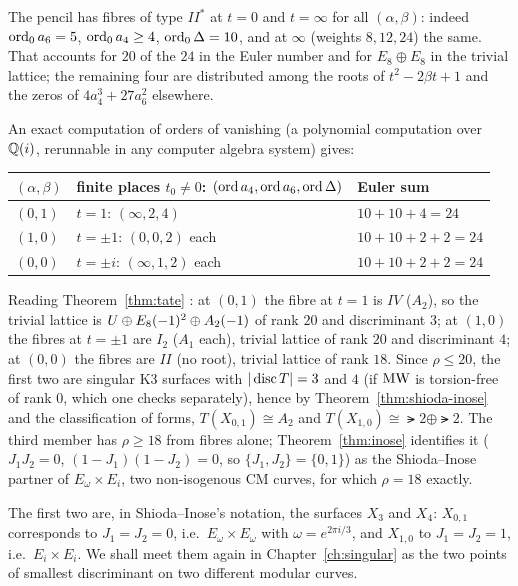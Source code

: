 The pencil has fibres of type $II^*$ at $t=0$ and $t=\infty$ for all
$(\alpha,\beta)$: indeed $\operatorname{ord}_0 a_6=5$, $\operatorname{ord}_0 a_4\ge4$, $\operatorname{ord}_0\Delta=10$,
and at $\infty$ (weights $8,12,24$) the same. That accounts for $20$ of the
$24$ in the Euler number and for $E_8\oplus E_8$ in the trivial lattice; the
remaining four are distributed among the roots of $t^2-2\beta t+1$ and the
zeros of $4a_4^3+27a_6^2$ elsewhere.

\begin{example}\label{ex:inose-points}
An exact computation of orders of vanishing (a polynomial computation over
$\mathbb{Q}(i)$, rerunnable in any computer algebra system) gives:
\begin{center}
\begin{tabular}{@{}lll@{}}
\toprule
$(\alpha,\beta)$ & finite places $t_0\neq0$: $(\operatorname{ord} a_4,\operatorname{ord} a_6,\operatorname{ord}\Delta)$ & Euler sum\\
\midrule
$(0,1)$ & $t=1$: $(\infty,2,4)$ & $10+10+4=24$\\
$(1,0)$ & $t=\pm1$: $(0,0,2)$ each & $10+10+2+2=24$\\
$(0,0)$ & $t=\pm i$: $(\infty,1,2)$ each & $10+10+2+2=24$\\
\bottomrule
\end{tabular}
\end{center}
Reading Theorem~\ref{thm:tate} \Lstatus: at $(0,1)$ the fibre at $t=1$ is
$IV$ ($A_2$), so the trivial lattice is $U\oplus E_8(-1)^2\oplus A_2(-1)$ of
rank $20$ and discriminant $3$; at $(1,0)$ the fibres at $t=\pm1$ are $I_2$
($A_1$ each), trivial lattice of rank $20$ and discriminant $4$; at $(0,0)$ the
fibres are $II$ (no root), trivial lattice of rank $18$. Since $\rho\le20$,
the first two are singular K3 surfaces with $|\operatorname{disc} T|=3$ and $4$ (if
$\operatorname{MW}$ is torsion-free of rank $0$, which one checks separately), hence by
Theorem~\ref{thm:shioda-inose} and the classification of forms,
$T(X_{0,1})\cong A_2$ and $T(X_{1,0})\cong\lat2\oplus\lat2$. The third member
has $\rho\ge18$ from fibres alone; Theorem~\ref{thm:inose} identifies it
($J_1J_2=0$, $(1-J_1)(1-J_2)=0$, so $\{J_1,J_2\}=\{0,1\}$) as the
Shioda--Inose partner of $E_\omega\times E_i$, two non-isogenous CM curves,
for which $\rho=18$ exactly.
\end{example}

The first two are, in Shioda--Inose's notation, the surfaces $X_3$ and $X_4$:
$X_{0,1}$ corresponds to $J_1=J_2=0$, i.e.\ $E_\omega\times E_\omega$ with
$\omega=e^{2\pi i/3}$, and $X_{1,0}$ to $J_1=J_2=1$, i.e.\ $E_i\times E_i$. We
shall meet them again in Chapter~\ref{ch:singular} as the two points of
smallest discriminant on two different modular curves.

